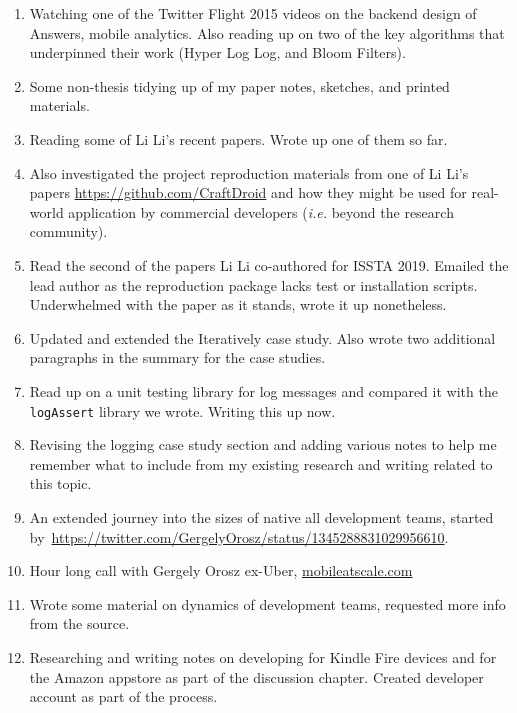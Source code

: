 \begin{enumerate}
    \item Watching one of the Twitter Flight 2015 videos on the backend design of Answers, mobile analytics. Also reading up on two of the key algorithms that underpinned their work (Hyper Log Log, and Bloom Filters).
    \item Some non-thesis tidying up of my paper notes, sketches, and printed materials.
    \item Reading some of Li Li's recent papers. Wrote up one of them so far.
    \item Also investigated the project reproduction materials from one of Li Li's papers \url{https://github.com/CraftDroid} and how they might be used for real-world application by commercial developers (\textit{i.e.} beyond the research community).
    \item Read the second of the papers Li Li co-authored for ISSTA 2019. Emailed the lead author as the reproduction package lacks test or installation scripts. Underwhelmed with the paper as it stands, wrote it up nonetheless.
    \item Updated and extended the Iteratively case study. Also wrote two additional paragraphs in the summary for the case studies.
    \item Read up on a unit testing library for log messages and compared it with the \texttt{logAssert} library we wrote. Writing this up now.
    \item Revising the logging case study section and adding various notes to help me remember what to include from my existing research and writing related to this topic.
    \item An extended journey into the sizes of native all development teams, started by~\url{https://twitter.com/GergelyOrosz/status/1345288831029956610}.
    \item Hour long call with Gergely Orosz ex-Uber, \href{https://www.mobileatscale.com/}{mobileatscale.com}
    \item Wrote some material on dynamics of development teams, requested more info from the source.
    \item Researching and writing notes on developing for Kindle Fire devices and for the Amazon appstore as part of the discussion chapter. Created developer account as part of the process.
\end{enumerate}
